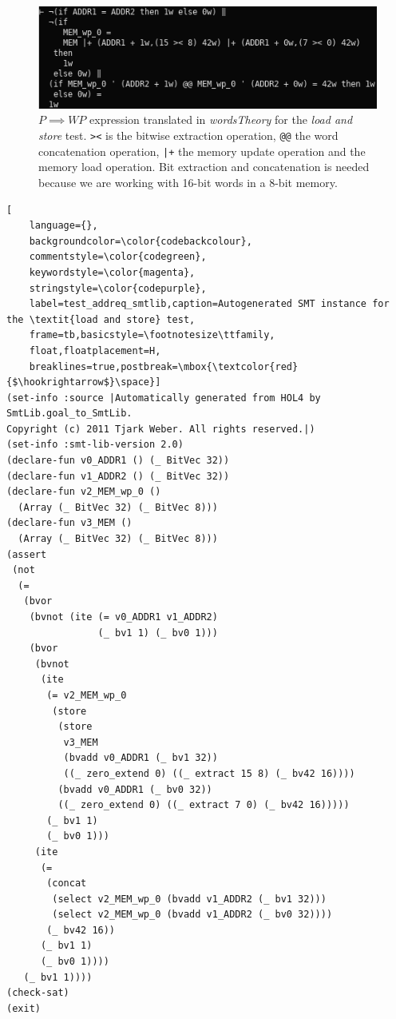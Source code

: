 \documentclass{kththesis}
\newcommand{\WP}{\ensuremath{\mathit{WP}}}
\begin{document}
\begin{figure}[!h]
	\includegraphics[width=\textwidth]{figures/test_addreq_words.png}
	\centering
	\caption{$P \implies \WP$ expression translated in \textit{wordsTheory} for the \textit{load and store} test. \texttt{><} is the bitwise extraction operation, \texttt{@@} the word concatenation operation, \texttt{|+} the memory update operation and \texttt{\textquotesingle} the memory load operation. Bit extraction and concatenation is needed because we are working with 16-bit words in a 8-bit memory.}
	\label{test_addreq_words}
\end{figure}

\begin{lstlisting}[
    language={},
    backgroundcolor=\color{codebackcolour},
    commentstyle=\color{codegreen},
    keywordstyle=\color{magenta},
    stringstyle=\color{codepurple},
    label=test_addreq_smtlib,caption=Autogenerated SMT instance for the \textit{load and store} test,
    frame=tb,basicstyle=\footnotesize\ttfamily,
    float,floatplacement=H,
    breaklines=true,postbreak=\mbox{\textcolor{red}{$\hookrightarrow$}\space}]
(set-info :source |Automatically generated from HOL4 by SmtLib.goal_to_SmtLib.
Copyright (c) 2011 Tjark Weber. All rights reserved.|)
(set-info :smt-lib-version 2.0)
(declare-fun v0_ADDR1 () (_ BitVec 32))
(declare-fun v1_ADDR2 () (_ BitVec 32))
(declare-fun v2_MEM_wp_0 ()
  (Array (_ BitVec 32) (_ BitVec 8)))
(declare-fun v3_MEM ()
  (Array (_ BitVec 32) (_ BitVec 8)))
(assert
 (not
  (=
   (bvor
    (bvnot (ite (= v0_ADDR1 v1_ADDR2)
                (_ bv1 1) (_ bv0 1)))
    (bvor
     (bvnot
      (ite
       (= v2_MEM_wp_0
        (store
         (store
          v3_MEM
          (bvadd v0_ADDR1 (_ bv1 32))
          ((_ zero_extend 0) ((_ extract 15 8) (_ bv42 16))))
         (bvadd v0_ADDR1 (_ bv0 32))
         ((_ zero_extend 0) ((_ extract 7 0) (_ bv42 16)))))
       (_ bv1 1)
       (_ bv0 1)))
     (ite
      (=
       (concat
        (select v2_MEM_wp_0 (bvadd v1_ADDR2 (_ bv1 32)))
        (select v2_MEM_wp_0 (bvadd v1_ADDR2 (_ bv0 32))))
       (_ bv42 16))
      (_ bv1 1)
      (_ bv0 1))))
   (_ bv1 1))))
(check-sat)
(exit)
\end{lstlisting}
\end{document}
